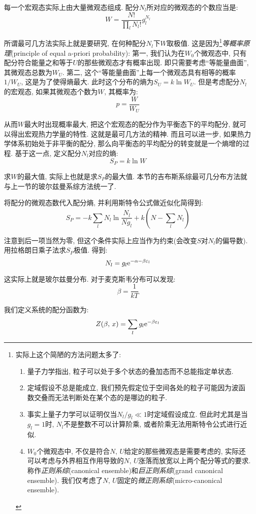 每一个宏观态实际上由大量微观态组成. 配分$N_l$所对应的微观态的个数应当是:
\[W=\frac{N!}{\displaystyle\prod_l N_l!}g_l^{N_l}\]

所谓最可几方法实际上就是要研究, 在何种配分$N_l$下$W$取极值. 这是因为\footnote{实际上这个简陋的方法问题太多了: \begin{enumerate}
	\item 量子力学指出, 粒子可以处于多个状态的叠加态而不总能指定单状态.
	\item 定域假设不总是能成立, 我们预先假定位于空间各处的粒子可能因为波函数交叠而无法判断处在某个态的是哪边的粒子.
	\item 事实上量子力学可以证明仅当$N_l/g_l\ll 1$时定域假设成立. 但此时尤其是当$g_l=1$时, $N_l$不是整数不可以计算阶乘, 或者阶乘无法用斯特令公式进行近似.
	\item $W_0$个微观态中, 不仅是符合$N,\,U$给定的那些微观态是需要考虑的, 实际还可以考虑与外界相互作用导致的$N,\,U$涨落而放宽以上两个配分等式的要求. 称作\emph{正则系综}(canonical ensemble)和\emph{巨正则系综}(grand canonical ensemble). 我们仅考虑了$N,\,U$固定的\emph{微正则系综}(micro-canonical ensemble).
\end{enumerate}
}\emph{等概率原理}(principle of equal a-priori probability): 第一, 我们认为在$W_0$个微观态中, 只有配分符合能量之和等于$U$的那些微观态才有概率出现. 即只需要考虑``等能量曲面'', 其微观态总数为$W_U$. 第二, 这个``等能量曲面''上每一个微观态具有相等的概率$1/W_U$, 这是为了使得熵最大. 此时这个分布的熵为$S_U=k\ln W_U$. 但是考虑配分$N_l$的宏观态, 如果其微观态个数为$W$, 其概率为:
\[p=\frac{W}{W_U}\]

从而$W$最大时出现概率最大, 把这个宏观态的配分作为平衡态下的平均配分, 就可以得出宏观热力学量的特性. 这就是最可几方法的精神. 而且可以进一步, 如果热力学体系初始处于非平衡的配分, 那么向平衡态的平均配分的转变就是一个熵增的过程. 基于这一点, 定义配分$N_l$对应的熵:
\[S_P=k\ln W\]

求$W$的最大值, 实际上也就是求$S_P$的最大值. 本节的吉布斯系综最可几分布方法就与上一节的玻尔兹曼系综方法统一了.

将配分的微观态数代入配分熵, 并利用斯特令公式做近似化简得到:
\[S_P=-k\sum_l N_l\ln\frac{N_l}{Ng_l}+k\left(N-\sum_l N_l\right)\]

注意到后一项当然为零, 但这个条件实际上应当作为约束(会改变$S$对$N_l$的偏导数). 用拉格朗日乘子法求$S_P$极值. 得到:
\[N_l=g_l{\rm e}^{-\alpha-\beta \varepsilon_l}\]

这实际上就是玻尔兹曼分布. 对于麦克斯韦分布可以发现:
\[\beta=\frac{1}{kT}\]

我们定义系统的配分函数为:
\[Z(\beta,\,x)=\sum_l g_l{\rm e}^{-\beta \varepsilon_l}\]

